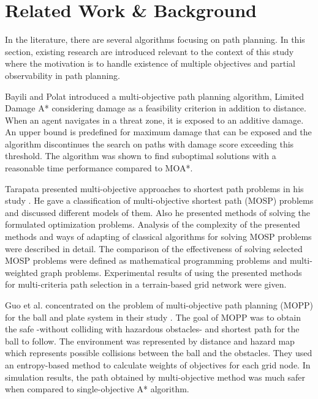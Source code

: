 \section{Related Work \& Background}
\label{chapter:relatedwork}

In the literature, there are several algorithms focusing on path planning. In this section, existing research are introduced relevant to the context of this study where the motivation is to handle existence of multiple objectives and partial observability in path planning.

Bayili and Polat introduced a multi-objective path planning algorithm, Limited Damage A*  \cite{LDAStarBayili:2008} considering damage as a feasibility criterion in addition to distance. When an agent navigates in a threat zone, it is exposed to an additive damage. An upper bound is predefined for maximum damage that can be exposed and the algorithm discontinues the search on paths with damage score exceeding this threshold. The algorithm was shown to find suboptimal solutions with a reasonable time performance compared to MOA*. 

Tarapata presented multi-objective approaches to shortest path problems in his study \cite{Tarapata:2007}. He gave a classification of multi-objective shortest path (MOSP) problems and discussed different models of them. Also he presented methods of solving the formulated optimization problems. Analysis of the complexity of the presented methods and ways of adapting of classical algorithms for solving MOSP problems were described in detail. The comparison of the effectiveness of solving selected MOSP problems were defined as mathematical programming problems and multi-weighted graph problems. Experimental results of using the presented methods for multi-criteria path selection in a terrain-based grid network were given.

Guo et al. concentrated on the problem of multi-objective path planning (MOPP) for the ball and plate system in their study \cite{Guo:2009}. The goal of MOPP was to obtain the safe -without colliding with hazardous obstacles- and shortest path for the ball to follow. The environment was represented by distance and hazard map which represents possible collisions between the ball and the obstacles. They used an entropy-based method to calculate weights of objectives for each grid node. In simulation results, the path obtained by multi-objective method was much safer when compared to single-objective A* algorithm.

